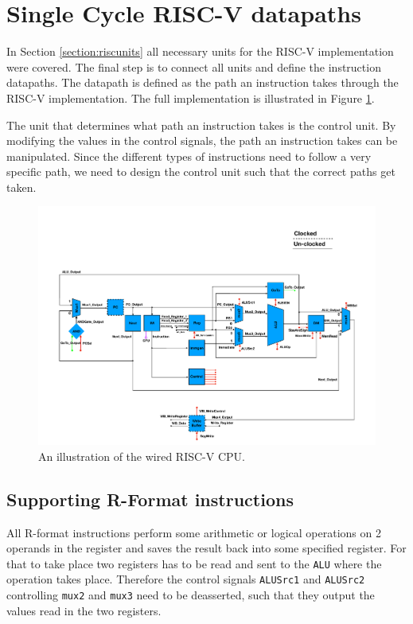 \section{Single Cycle RISC-V datapaths}\label{section:Datapaths}
    In Section \ref{section:riscunits} all necessary units for the RISC-V implementation were covered. The final step is to connect all units and define the instruction datapaths. The datapath is defined as the path an instruction takes through the RISC-V implementation. The full implementation is illustrated in Figure \ref{fig:RISCV}. 
    
    The unit that determines what path an instruction takes is the control unit. By modifying the values in the control signals, the path an instruction takes can be manipulated. Since the different types of instructions need to follow a very specific path, we need to design the control unit such that the correct paths get taken.
    
    \begin{figure}[h!]
        \hspace*{-3.8cm}
        \centering
        \includegraphics[scale=0.8]{pictures/RISCV.pdf}
        \caption{An illustration of the wired RISC-V CPU.}
        \label{fig:RISCV}
    \end{figure} 

    \subsection{Supporting R-Format instructions}\label{section:Rformat}
        All R-format instructions perform some arithmetic or logical operations on 2 operands in the register and saves the result back into some specified register. For that to take place two registers has to be read and sent to the \texttt{ALU} where the operation takes place. Therefore the control signals \texttt{ALUSrc1} and \texttt{ALUSrc2} controlling \texttt{mux2} and \texttt{mux3} need to be deasserted, such that they output the values read in the two registers. 
        
